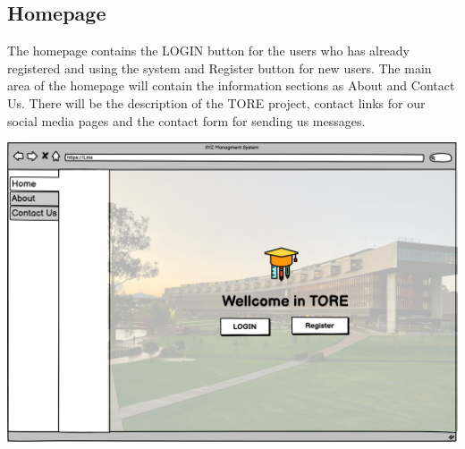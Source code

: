 \subsection{Homepage}
The homepage contains the LOGIN button for the users who has already registered and using the system and Register button for new users. The main area of the homepage will contain the information sections as About and Contact Us. There will be the description of the TORE project, contact links for our social media pages and the contact form for sending us messages.   

\includegraphics[width=\columnwidth]{images/HomePage.png}